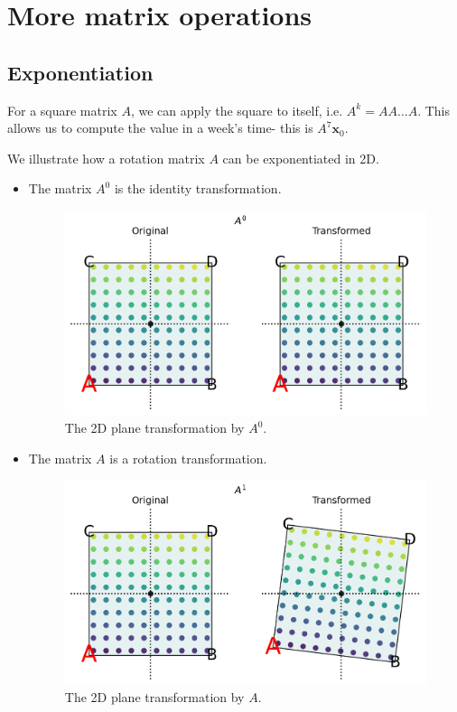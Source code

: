 \documentclass[a4paper, openany]{memoir}
\begin{document}
    \section{More matrix operations}
    \subsection{Exponentiation}
    For a square matrix $A$, we can apply the square to itself, i.e. $A^k = AA \dots A$. This allows us to compute the value in a week's time- this is $A^7 \mathbf{x}_0$.

    We illustrate how a rotation matrix $A$ can be exponentiated in 2D.
    \begin{itemize}
        \item The matrix $A^0$ is the identity transformation.
        \begin{figure}[H]
            \centering
            \includegraphics[scale=0.4]{src/3.21 A^0.png}
            \caption{The 2D plane transformation by $A^0$.}
        \end{figure}

        \item The matrix $A$ is a rotation transformation.
        \begin{figure}[H]
            \centering
            \includegraphics[scale=0.4]{src/3.22 A^1.png}
            \caption{The 2D plane transformation by $A$.}
        \end{figure}
        

\end{itemize}
\end{document}
